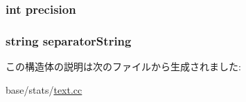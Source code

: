 \label{structStats_1_1DistPrint_a8ccf841cb59e451791bcb2e1ac4f1edc}
\hypertarget{structStats_1_1DistPrint_aa95455ed52a8459fad69509a4a0411b5}{
\subsubsection[{precision}]{\setlength{\rightskip}{0pt plus 5cm}int {\bf precision}}}
\label{structStats_1_1DistPrint_aa95455ed52a8459fad69509a4a0411b5}
\hypertarget{structStats_1_1DistPrint_ae18f266d1f96dc3dc8b179e00cf6c6f1}{
\subsubsection[{separatorString}]{\setlength{\rightskip}{0pt plus 5cm}string {\bf separatorString}}}
\label{structStats_1_1DistPrint_ae18f266d1f96dc3dc8b179e00cf6c6f1}


この構造体の説明は次のファイルから生成されました:\begin{DoxyCompactItemize}
\item 
base/stats/\hyperlink{text_8cc}{text.cc}\end{DoxyCompactItemize}
